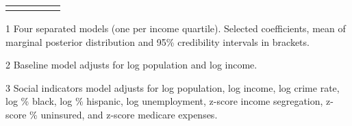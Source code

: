 \begin{table}[htp]
\begin{threeparttable}
\begin{tabular}{l D{.}{.}{5.11} D{.}{.}{5.11} D{.}{.}{5.11} D{.}{.}{5.11} }
 \addlinespace[5pt]
\bottomrule
\end{tabular}
\begin{tablenotes}[flushleft]
\scriptsize
\item [1] Four separated models (one per income quartile). Selected coefficients, mean of marginal posterior distribution and 95\% credibility intervals in brackets.
\item [2] Baseline model adjusts for log population and log income.
\item [3] Social indicators model adjusts for log population, log income, log crime rate, log \% black, log \% hispanic, log unemployment, z-score income segregation, z-score \% uninsured, and z-score medicare expenses.
\end{tablenotes}
\end{threeparttable}
\end{table}
